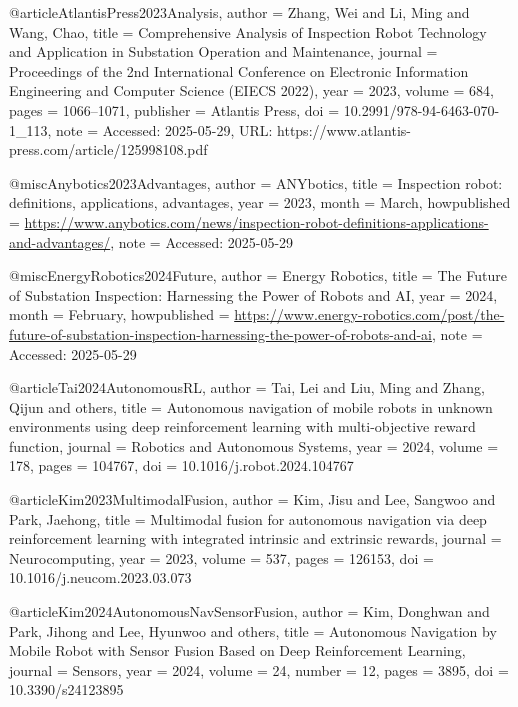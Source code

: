 @article{AtlantisPress2023Analysis,
  author       = {Zhang, Wei and Li, Ming and Wang, Chao},
  title        = {Comprehensive Analysis of Inspection Robot Technology and Application in Substation Operation and Maintenance},
  journal      = {Proceedings of the 2nd International Conference on Electronic Information Engineering and Computer Science (EIECS 2022)},
  year         = {2023},
  volume       = {684},
  pages        = {1066--1071},
  publisher    = {Atlantis Press},
  doi          = {10.2991/978-94-6463-070-1_113},
  note         = {Accessed: 2025-05-29, URL: https://www.atlantis-press.com/article/125998108.pdf}
}

@misc{Anybotics2023Advantages,
  author       = {ANYbotics},
  title        = {Inspection robot: definitions, applications, advantages},
  year         = {2023},
  month        = {March},
  howpublished = {\url{https://www.anybotics.com/news/inspection-robot-definitions-applications-and-advantages/}},
  note         = {Accessed: 2025-05-29}
}

@misc{EnergyRobotics2024Future,
  author       = {Energy Robotics},
  title        = {The Future of Substation Inspection: Harnessing the Power of Robots and AI},
  year         = {2024},
  month        = {February},
  howpublished = {\url{https://www.energy-robotics.com/post/the-future-of-substation-inspection-harnessing-the-power-of-robots-and-ai}},
  note         = {Accessed: 2025-05-29}
}

@article{Tai2024AutonomousRL,
  author    = {Tai, Lei and Liu, Ming and Zhang, Qijun and others},
  title     = {Autonomous navigation of mobile robots in unknown environments using deep reinforcement learning with multi-objective reward function},
  journal   = {Robotics and Autonomous Systems},
  year      = {2024},
  volume    = {178},
  pages     = {104767},
  doi       = {10.1016/j.robot.2024.104767}
}

@article{Kim2023MultimodalFusion,
  author    = {Kim, Jisu and Lee, Sangwoo and Park, Jaehong},
  title     = {Multimodal fusion for autonomous navigation via deep reinforcement learning with integrated intrinsic and extrinsic rewards},
  journal   = {Neurocomputing},
  year      = {2023},
  volume    = {537},
  pages     = {126153},
  doi       = {10.1016/j.neucom.2023.03.073}
}

@article{Kim2024AutonomousNavSensorFusion,
  author    = {Kim, Donghwan and Park, Jihong and Lee, Hyunwoo and others},
  title     = {Autonomous Navigation by Mobile Robot with Sensor Fusion Based on Deep Reinforcement Learning},
  journal   = {Sensors},
  year      = {2024},
  volume    = {24},
  number    = {12},
  pages     = {3895},
  doi       = {10.3390/s24123895}
}



